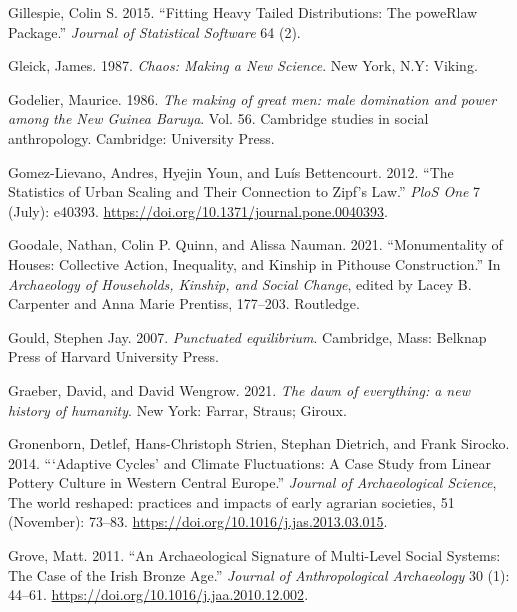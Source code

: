 \documentclass[
  12pt,
  a4paper, twoside]{book}
\newlength{\cslhangindent}
\newlength{\cslentryspacingunit} %
\newenvironment{CSLReferences}[2] %
 {%
  \setlength{\parindent}{0pt}
  \ifodd #1
  \let\oldpar\par
  \def\par{\hangindent=\cslhangindent\oldpar}
  \fi
  \setlength{\parskip}{#2\cslentryspacingunit}
 }%
 {}
\begin{document}
\begin{CSLReferences}{1}{0}
\leavevmode{}%
Gillespie, Colin S. 2015. {``Fitting Heavy Tailed Distributions: The poweRlaw Package.''} \emph{Journal of Statistical Software} 64 (2).

\leavevmode{}%
Gleick, James. 1987. \emph{Chaos: Making a New Science}. {New York, N.Y}: {Viking}.

\leavevmode{}%
Godelier, Maurice. 1986. \emph{The making of great men: male domination and power among the New Guinea Baruya}. Vol. 56. Cambridge studies in social anthropology. Cambridge: University Press.

\leavevmode{}%
Gomez-Lievano, Andres, Hyejin Youn, and Luís Bettencourt. 2012. {``The Statistics of Urban Scaling and Their Connection to Zipf{'}s Law.''} \emph{PloS One} 7 (July): e40393. \url{https://doi.org/10.1371/journal.pone.0040393}.

\leavevmode{}%
Goodale, Nathan, Colin P. Quinn, and Alissa Nauman. 2021. {``Monumentality of Houses: {Collective} Action, Inequality, and Kinship in Pithouse Construction.''} In \emph{Archaeology of {Households}, {Kinship}, and {Social Change}}, edited by Lacey B. Carpenter and Anna Marie Prentiss, 177--203. {Routledge}.

\leavevmode{}%
Gould, Stephen Jay. 2007. \emph{Punctuated equilibrium}. Cambridge, Mass: Belknap Press of Harvard University Press.

\leavevmode{}%
Graeber, David, and David Wengrow. 2021. \emph{The dawn of everything: a new history of humanity}. New York: Farrar, Straus; Giroux.

\leavevmode{}%
Gronenborn, Detlef, Hans-Christoph Strien, Stephan Dietrich, and Frank Sirocko. 2014. {``{`}Adaptive Cycles{'} and Climate Fluctuations: A Case Study from Linear Pottery Culture in Western Central Europe.''} \emph{Journal of Archaeological Science}, The world reshaped: practices and impacts of early agrarian societies, 51 (November): 73--83. \url{https://doi.org/10.1016/j.jas.2013.03.015}.

\leavevmode{}%
Grove, Matt. 2011. {``An Archaeological Signature of Multi-Level Social Systems: The Case of the Irish Bronze Age.''} \emph{Journal of Anthropological Archaeology} 30 (1): 44--61. \url{https://doi.org/10.1016/j.jaa.2010.12.002}.


\end{CSLReferences}
\end{document}
